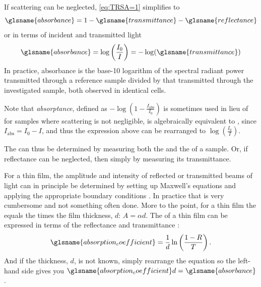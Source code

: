 \documentclass[draft,webedition,openright,titles,swedish,english]{LuaUUThesis}\usepackage[]{graphicx}\usepackage[]{xcolor}
\def\x{0}}]%
\let\x=\pgfmathresult}]%
\def\rnd{.%
\pdfuniformdeviate10%
\pdfuniformdeviate10%
\pdfuniformdeviate10%
}
\begin{document}
{
}
If scattering can be neglected, \cref{eq:TRSA=1} simplifies to
\begin{equation}
\glsname{absorbance} = 1  - \glsname{transmittance} - \glsname{reflectance}
\end{equation}
or in terms of incident and transmitted light
\begin{equation}
\glsname{absorbance} =
\log\left(\frac{I_0}{I}\right) =
-\log(\glsname{transmittance})
\end{equation}
In practice, \gls{absorbance} is the base-10 logarithm of the spectral radiant power
transmitted through a reference sample divided by that
transmitted through the investigated sample, both observed in identical cells.

Note that \emph{absorptance}, defined as $-\log(1-\frac{I_\text{abs}}{I_0})$ \cite{Cohen2008}
is sometimes used in lieu of  for samples where scattering
is not negligible, is algebraically equivalent to , since
$I_\mathrm{abs} = I_0 - I$, and thus the expression above can be rearranged
to $\log\left(\frac{I_0}{I}\right)$.

The  can thus be determined by measuring both the 
and the  of a sample. Or, if reflectance can be neglected, then simply
by measuring its transmittance.

For a thin film, the amplitude and intensity of reflected or transmitted beams
of light can in principle be determined by setting up Maxwell's equations
and applying the appropriate boundary conditions \cite{Heavens1955}.
In practice that is very cumbersome and not something often done.
More to the point, for a thin film the  equals the
 times the film thickness, $d$: $A=\alpha d$.
The  of a thin film can be expressed in terms
of the reflectance and transmittance \cite{Green2012}:
\begin{equation}\label{eq:alpha-thickness}
\glsname{absorption_coefficient} = \frac{1}{d}\ln\left(\frac{1-R}{T}\right).
\end{equation}
And if the thickness, $d$, is not known, simply rearrange the equation so the
left-hand side gives you $\glsname{absorption_coefficient}d = \glsname{absorbance}$.
\end{document}
